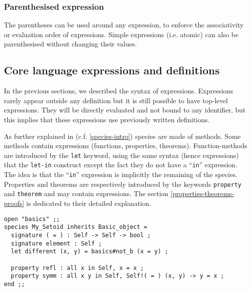 \subsubsection{Parenthesised expression}
The parentheses can be used around any expression, to enforce the
associativity or evaluation order of expressions. Simple expressions
(i.e. atomic) can also be parenthesised without changing their
values.



\subsection{Core language expressions and definitions}
In the previous sections, we described the syntax of
expressions. Expressions rarely appear outside any
definition but it is still possible to have top-level
expressions. They  will be directly evaluated and not bound to any
identifier, but this implies that these expressions use previously
written definitions.

\medskip
As   further explained  in (c.f. \ref{species-intro}) species are made
of methods. Some methods contain expressions (functions, properties,
theorems). Function-methods are introduced by the {\tt let} keyword,
using the same syntax (hence expressions) that the {\tt let-in}
construct except the fact they do not have a ``{\tt in}'' expression.
The idea is that the ``{\tt in}'' expression is implicitly the
remaining of the species. Properties and theorems are respectively
introduced by the keywords {\tt property} and {\tt theorem} and may
 contain expressions. The  section
\ref{properties-theorems-proofs}  is dedicated to their detailed explanation.
{\scriptsize
\begin{lstlisting}
open "basics" ;;
species My_Setoid inherits Basic_object =
  signature ( = ) : Self -> Self -> bool ;
  signature element : Self ;
  let different (x, y) = basics#not_b (x = y) ;

  property refl : all x in Self, x = x ;
  property symm : all x y in Self, Self!( = ) (x, y) -> y = x ;
end ;;
\end{lstlisting}
}


\medskip

